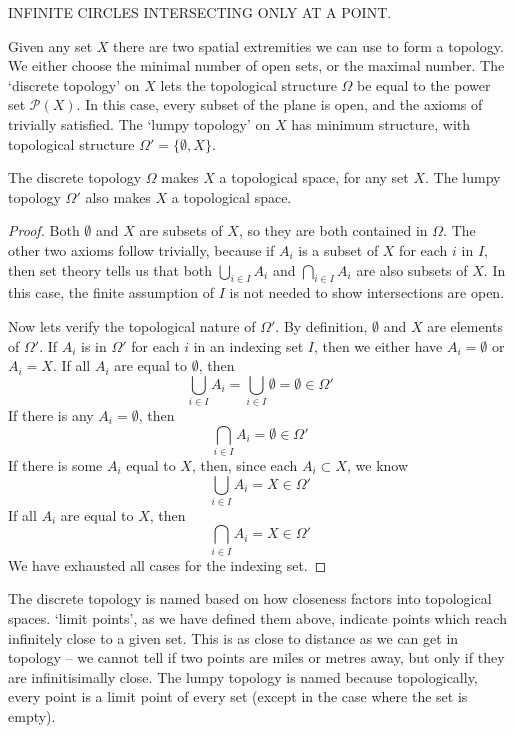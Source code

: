 INFINITE CIRCLES INTERSECTING ONLY AT A POINT.

Given any set $X$ there are two spatial extremities we can use to form a topology. We either choose the minimal number of open sets, or the maximal number. The `discrete topology' on $X$ lets the topological structure $\Omega$ be equal to the power set $\mathcal{P}(X)$. In this case, every subset of the plane is open, and the axioms of trivially satisfied. The `lumpy topology' on $X$ has minimum structure, with topological structure $\Omega' = \{\emptyset, X\}$.

\begin{theorem}
    The discrete topology $\Omega$ makes $X$ a topological space, for any set $X$. The lumpy topology $\Omega'$ also makes $X$ a topological space.
\end{theorem}
\begin{proof}
    Both $\emptyset$ and $X$ are subsets of $X$, so they are both contained in $\Omega$. The other two axioms follow trivially, because if $A_i$ is a subset of $X$ for each $i$ in $I$, then set theory tells us that both $\bigcup_{i \in I} A_i$ and $\bigcap_{i \in I} A_i$ are also subsets of $X$. In this case, the finite assumption of $I$ is not needed to show intersections are open.

    Now lets verify the topological nature of $\Omega'$. By definition, $\emptyset$ and $X$ are elements of $\Omega'$. If $A_i$ is in $\Omega'$ for each $i$ in an indexing set $I$, then we either have $A_i = \emptyset$ or $A_i = X$. If all $A_i$ are equal to $\emptyset$, then
    \[ \bigcup_{i \in I} A_i = \bigcup_{i \in I} \emptyset = \emptyset \in \Omega' \]
    If there is any $A_i = \emptyset$, then
    \[ \bigcap_{i \in I} A_i = \emptyset \in \Omega' \]
    If there is some $A_i$ equal to $X$, then, since each $A_i \subset X$, we know
    \[ \bigcup_{i \in I} A_i = X \in \Omega' \]
    If all $A_i$ are equal to $X$, then
    \[ \bigcap_{i \in I} A_i = X \in \Omega' \]
    We have exhausted all cases for the indexing set.
\end{proof}

The discrete topology is named based on how closeness factors into topological spaces. `limit points', as we have defined them above, indicate points which reach infinitely close to a given set. This is as close to distance as we can get in topology -- we cannot tell if two points are miles or metres away, but only if they are infinitisimally close. The lumpy topology is named because topologically, every point is a limit point of every set (except in the case where the set is empty).

